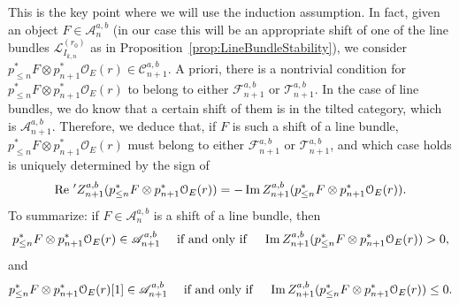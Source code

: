 \documentclass[11pt, reqno]{amsart}
\numberwithin{equation}{section}
\theoremstyle{plain}
\theoremstyle{remark}
\theoremstyle{definition}
\theoremstyle{italicsname}
\def\Re{\mathop{\rm Re}\nolimits}
\def\Im{\mathop{\rm Im}\nolimits}
\newcommand{\cO}{\mathcal{O}}
\newcommand{\cF}{\mathcal{F}}
\newcommand{\cL}{\mathcal{L}}
\newcommand{\cT}{\mathcal{T}}
\newcommand{\cA}{\mathscr{A}}
\newcommand{\cC}{\mathscr{C}}
\begin{document}
This is the key point where we will use the induction assumption.
In fact, given an object $F\in\cA_n^{a,b}$ (in our case this will be an appropriate shift of one of the line bundles $\cL^{(r_0)}_{I_{k,n}}$ as in Proposition~\ref{prop:LineBundleStability}), we consider $p_{\leq n}^*F\otimes p_{n+1}^*\cO_E(r)\in\cC_{n+1}^{a,b}$.
A priori, there is a nontrivial condition for $p_{\leq n}^*F\otimes p_{n+1}^*\cO_E(r)$ to belong to either $\cF_{n+1}^{a,b}$ or $\cT_{n+1}^{a,b}$.
In the case of line bundles, we do know that a certain shift of them is in the tilted category, which is $\cA_{n+1}^{a,b}$.
Therefore, we deduce that, if $F$ is such a shift of a line bundle, $p_{\leq n}^*F\otimes p_{n+1}^*\cO_E(r)$ must belong to either $\cF_{n+1}^{a,b}$ or $\cT_{n+1}^{a,b}$, and which case holds is  uniquely determined by the sign of
\[
\Re\, {'Z_{n+1}^{a,b}}(p_{\leq n}^*F\otimes p_{n+1}^*\cO_E(r))=-\Im Z_{n+1}^{a,b}(p_{\leq n}^*F\otimes p_{n+1}^*\cO_E(r)).
\]
To summarize: if $F\in\cA_n^{a,b}$ is a shift of a line bundle, then
\begin{equation}\label{eq:PositivityZParis6}
p_{\leq n}^*F\otimes p_{n+1}^*\cO_E(r)\in\cA_{n+1}^{a,b}\quad\text{ if and only if }\quad \Im Z_{n+1}^{a,b}(p_{\leq n}^*F\otimes p_{n+1}^*\cO_E(r))>0,    
\end{equation}
and
\begin{equation}\label{eq:PositivityZParis7}
p_{\leq n}^*F\otimes p_{n+1}^*\cO_E(r)[1]\in\cA_{n+1}^{a,b}\quad\text{ if and only if }\quad \Im Z_{n+1}^{a,b}(p_{\leq n}^*F\otimes p_{n+1}^*\cO_E(r))\leq0.
\end{equation}
\end{document}
